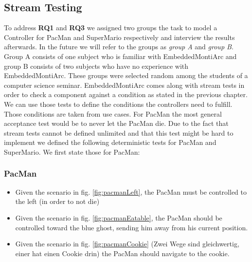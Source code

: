 \subsection{Stream Testing}
To address \textbf{RQ1} and \textbf{RQ3} we assigned two groups the task to model a Controller for PacMan and SuperMario respectively and interview the results afterwards. In the future we will refer to the groups as \textit{group A} and \textit{group B}. Group A consists of one subject who is familiar with EmbeddedMontiArc and group B consists of two subjects who have no experience with EmbeddedMontiArc. These groups were selected random among the students of a computer science seminar. 
EmbeddedMontiArc comes along with stream tests in order to check a component against a condition as stated in the previous chapter.
We can use those tests to define the conditions the controllers need to fulfill. Those conditions are taken from use cases. For PacMan the most general acceptance test would be to never let the PacMan die. Due to the fact that stream tests cannot be defined unlimited and that this test might be hard to implement we defined the following deterministic tests for PacMan and SuperMario. We first state those for PacMan:

\subsubsection{PacMan}
\begin{itemize}
	\item Given the scenario in fig. \ref{fig:pacmanLeft}, the PacMan must be controlled to the left (in order to not die)
	\item Given the scenario in fig. \ref{fig:pacmanEatable}, the PacMan should be controlled toward the blue ghost, sending him away from his current position.
	\item Given the scenario in fig. \ref{fig:pacmanCookie} (Zwei Wege sind gleichwertig, einer hat einen Cookie drin) the PacMan should navigate to the cookie.
\end{itemize}

